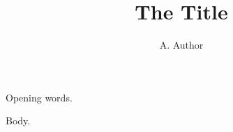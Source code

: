 \documentclass{article}
\title{The Title}
\author{A. Author}
\begin{document}
Opening words.

\noindent\begin{minipage}{\textwidth}\maketitle\end{minipage}

Body.
\end{document}
